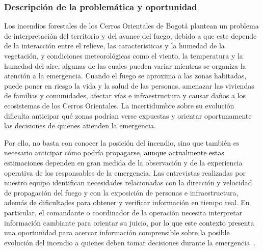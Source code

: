 \subsubsection{Descripción de la problemática y oportunidad}\label{sec:problematica}
Los incendios forestales de los Cerros Orientales de Bogotá plantean un problema de interpretación del territorio y del avance del fuego, debido a que este depende de la interacción entre el relieve, las características y la humedad de la vegetación, y condiciones meteorológicas como el viento, la temperatura y la humedad del aire, algunas de las cuales pueden variar mientras se organiza la atención a la emergencia. Cuando el fuego se aproxima a las zonas habitadas, puede poner en riesgo la vida y la salud de las personas, amenazar las viviendas de familias y comunidades, afectar vías e infraestructura y causar daños a los ecosistemas de los Cerros Orientales. La incertidumbre sobre su evolución dificulta anticipar qué zonas podrían verse expuestas y orientar oportunamente las decisiones de quienes atienden la emergencia.

Por ello, no basta con conocer la posición del incendio, sino que también es necesario anticipar cómo podría propagarse, \textcolor{black}{aunque actualmente estas estimaciones} dependen en gran medida de la observación y de la experiencia operativa de los responsables de la emergencia. Las entrevistas realizadas por nuestro equipo identifican necesidades relacionadas con la dirección y velocidad de propagación del fuego y con la exposición de personas e infraestructura, además de dificultades para obtener y verificar información en tiempo real. En particular, el comandante o coordinador de la operación necesita interpretar información cambiante para orientar su juicio, \textcolor{black}{por lo que este contexto presenta} una oportunidad para acercar información comprensible sobre la posible evolución del incendio a quienes deben tomar decisiones durante la emergencia~\cite{entrevistas2026}.
